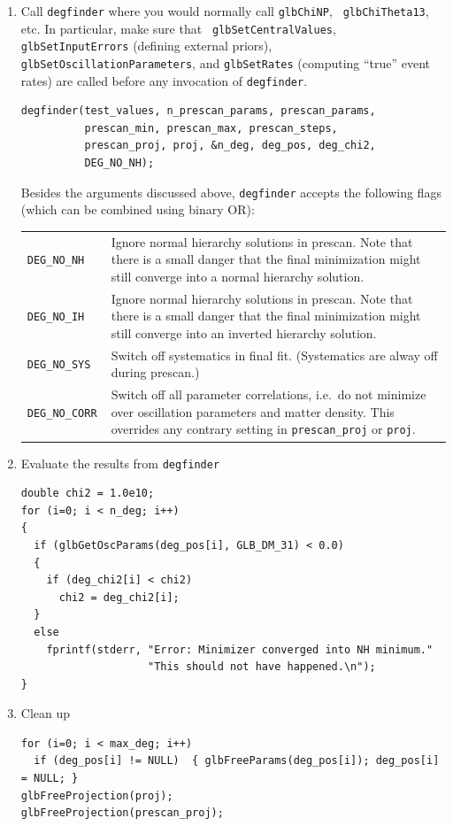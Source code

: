 \documentclass[12pt,a4paper]{article}
\theoremstyle{dotless}
\begin{document}
\begin{enumerate}
  \item Call {\tt degfinder} where you would normally call {\tt glbChiNP}, {\tt
    glbChiTheta13}, etc. In particular, make sure that {\tt
    glbSetCentralValues}, {\tt glbSetInputErrors} (defining external priors),
    {\tt glbSetOscillationParameters}, and {\tt glbSetRates} (computing
    ``true'' event rates) are called before any invocation of {\tt degfinder}.
    \begin{verbatim}
degfinder(test_values, n_prescan_params, prescan_params,
          prescan_min, prescan_max, prescan_steps,
          prescan_proj, proj, &n_deg, deg_pos, deg_chi2,
          DEG_NO_NH);    
    \end{verbatim}
    Besides the arguments discussed above, {\tt degfinder} accepts the
    following flags (which can be combined using binary OR):

    \begin{tabular}{lp{12cm}}
      \tt DEG\_NO\_NH    & Ignore normal hierarchy solutions in prescan. Note
                           that there is a small danger that the final minimization
                           might still converge into a normal hierarchy solution.    \\
      \tt DEG\_NO\_IH    & Ignore normal hierarchy solutions in prescan. Note
                           that there is a small danger that the final minimization
                           might still converge into an inverted hierarchy solution. \\
      \tt DEG\_NO\_SYS   & Switch off systematics in final fit. (Systematics are alway
                           off during prescan.)                                      \\
      \tt DEG\_NO\_CORR  & Switch off all parameter correlations, i.e.\ do not
                           minimize over oscillation parameters and matter density.
                           This overrides any contrary setting in {\tt prescan\_proj}
                           or {\tt proj}.
    \end{tabular}

  \item Evaluate the results from {\tt degfinder}
    \begin{verbatim}
double chi2 = 1.0e10;
for (i=0; i < n_deg; i++)
{     
  if (glbGetOscParams(deg_pos[i], GLB_DM_31) < 0.0)
  { 
    if (deg_chi2[i] < chi2)
      chi2 = deg_chi2[i];
  } 
  else
    fprintf(stderr, "Error: Minimizer converged into NH minimum."
                    "This should not have happened.\n");
}     
    \end{verbatim}

  \item Clean up
    \begin{verbatim}
for (i=0; i < max_deg; i++)
  if (deg_pos[i] != NULL)  { glbFreeParams(deg_pos[i]); deg_pos[i] = NULL; }
glbFreeProjection(proj);
glbFreeProjection(prescan_proj);    
    \end{verbatim}
\end{enumerate}
\end{document}
